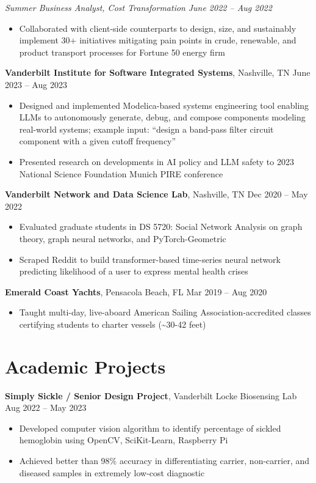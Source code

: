 \documentclass[10.5pt]{article}
\newcommand{\postlinebreakspacing} {
  \vspace{0.7ex}
}
\newcommand{\roleheader}[3]{
  \postlinebreakspacing
  \textbf{#1}, #2 \hfill #3
}
\newcommand{\itemizedrole}[5]{
  \roleheader{#1}{#2}{#3 -- #4}

  \begin{itemize}
    #5
  \end{itemize}
}
\newcommand{\subrole}[5]{
  \vspace{0.4ex}
  \textit{#1, #2} \hfill \textit{#3 -- #4}

  \begin{itemize}
    #5
  \end{itemize}
}
\begin{document}
{	\subrole
	{Summer Business Analyst}
	{Cost Transformation}
	{June 2022}
	{Aug 2022}
	{
		\item Collaborated with client-side counterparts to design, size, and sustainably implement 30+ initiatives mitigating pain points in crude, renewable, and product transport processes for Fortune 50 energy firm

	}
}

\itemizedrole
{Vanderbilt Institute for Software Integrated Systems}
{Nashville, TN}
{June 2023}
{Aug 2023}
{

	\item Designed and implemented Modelica-based systems engineering tool enabling LLMs to autonomously generate, debug, and compose components modeling real-world systems; example input: ``design a band-pass filter circuit component with a given cutoff frequency''
	\item Presented research on developments in AI policy and LLM safety to 2023 National Science Foundation Munich PIRE conference
}

\itemizedrole
{Vanderbilt Network and Data Science Lab}
{Nashville, TN}
{Dec 2020}
{May 2022}
{

	\item Evaluated graduate students in DS 5720: Social Network Analysis on graph theory, graph neural networks, and PyTorch-Geometric
	\item Scraped Reddit to build transformer-based time-series neural network predicting likelihood of a user to express mental health crises
}

\itemizedrole
{Emerald Coast Yachts}
{Pensacola Beach, FL}
{Mar 2019}
{Aug 2020}
{
	\item Taught multi-day, live-aboard American Sailing Association-accredited classes certifying students to charter vessels (\textasciitilde30-42 feet)
}


\section*{Academic Projects}
\itemizedrole
{Simply Sickle / Senior Design Project}
{Vanderbilt Locke Biosensing Lab}
{Aug 2022}
{May 2023}
{
	\item Developed computer vision algorithm to identify percentage of sickled hemoglobin using OpenCV, SciKit-Learn, Raspberry Pi
	\item Achieved better than 98\% accuracy in differentiating carrier, non-carrier, and diseased samples in extremely low-cost diagnostic
}
\end{document}
